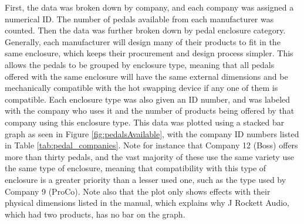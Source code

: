		First, the data was broken down by company, and each company was assigned a numerical ID.  The number of pedals available from each manufacturer was counted.  Then the data was further broken down by pedal enclosure category.  Generally, each manufacturer will design many of their products to fit in the same enclosure, which keeps their procurement and design process simpler.  This allows the pedals to be grouped by enclosure type, meaning that all pedals offered with the same enclosure will have the same external dimensions and be mechanically compatible with the hot swapping device if any one of them is compatible.  Each enclosure type was also given an ID number, and was labeled with the company who uses it and the number of products being offered by that company using this enclosure type.  This data was plotted using a stacked bar graph as seen in Figure \ref{fig:pedalsAvailable}, with the company ID numbers listed in Table \ref{tab:pedal_companies}.  Note for instance that Company 12 (Boss) offers more than thirty pedals, and the vast majority of these use the same variety use the same type of enclosure, meaning that compatibility with this type of enclosure is a greater priority than a lesser used one, such as the type used by Company 9 (ProCo).  Note also that the plot only shows effects with their physical dimensions listed in the manual, which explains why J Rockett Audio, which had two products, has no bar on the graph.




